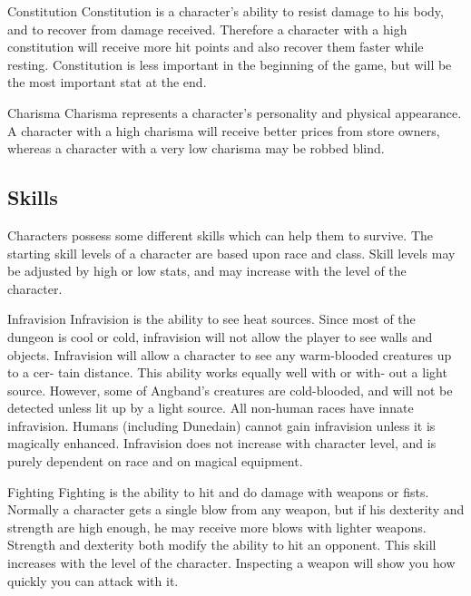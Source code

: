           Constitution
               Constitution is a character's ability to resist damage to his
               body, and to recover from damage received. Therefore a
               character with a high constitution will receive more hit
               points and also recover them faster while resting. Constitution
               is less important in the beginning of the game, but will be the
               most important stat at the end.
 
          Charisma
               Charisma represents a character's personality and physical
               appearance. A character with a high charisma will receive
               better prices from store owners, whereas a character with a
               very low charisma may be robbed blind.
 

\subsection{Skills}

Characters possess some different skills which can help them to survive.
The starting skill levels of a character are based upon race and class.
Skill levels may be adjusted by high or low stats, and may increase with
the level of the character.

          Infravision
               Infravision is the ability to see heat sources. Since most
               of the dungeon is cool or cold, infravision will not allow
               the player to see walls and objects. Infravision will allow
               a character to see any warm-blooded creatures up to a cer-
               tain distance. This ability works equally well with or with-
               out a light source. However, some of Angband's creatures are
               cold-blooded, and will not be detected unless lit up by a
               light source. All non-human races have innate infravision.
               Humans (including Dunedain) cannot gain infravision unless it
               is magically enhanced. Infravision does not increase with
               character level, and is purely dependent on race and on
               magical equipment.
 
          Fighting
               Fighting is the ability to hit and do damage with weapons or
               fists. Normally a character gets a single blow from any
               weapon, but if his dexterity and strength are high enough,
               he may receive more blows with lighter weapons. Strength and
               dexterity both modify the ability to hit an opponent. This
               skill increases with the level of the character. Inspecting a
               weapon will show you how quickly you can attack with it.
 
